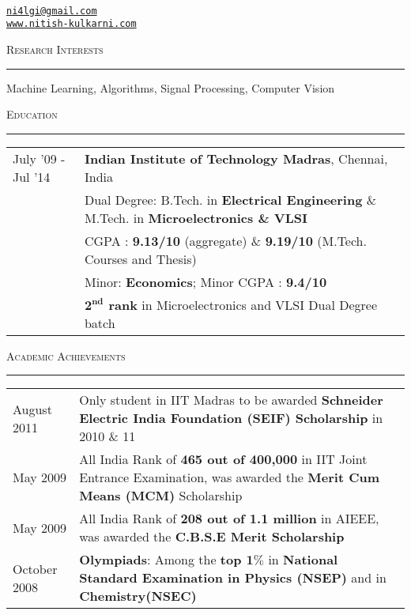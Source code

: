 \documentclass[8pt,a4paper,English]{article}
\newcommand{\lv}{\color{table-border}\vrule}
\newcommand\roottitle[1]{ \vspace{3mm} \noindent \textsc{ \large #1} \vspace{1.5mm} \nopagebreak[4] \color{gray} \hrule \color{black} \vspace{2mm} \noindent \small }
\begin{document}
 \\
\vspace{-5mm}

\begin{normalsize}
    \raggedleft \href{mailto:ni4lgi@gmail.com}{\texttt{ni4lgi\mbox{}@\mbox{}gmail.com}} \\
    \href{http://www.nitish-kulkarni.com}{\texttt{www.nitish-kulkarni.com}} \\
\end{normalsize}



\roottitle{Research Interests}
Machine Learning, Algorithms, Signal Processing, Computer Vision 

\roottitle{Education}
\renewcommand{\arraystretch}{1.2}
\setlength\tabcolsep{8pt}
\begin{tabularx}{\textwidth}{R{2.6cm} !{\lv} X}
  July '09 - Jul '14    & \textbf{Indian Institute of Technology Madras}, Chennai, India \\
                        & Dual Degree: B.Tech. in \textbf{Electrical Engineering} \& M.Tech. in \textbf{Microelectronics \& VLSI} \\
                        & CGPA : \textbf{9.13/10} (aggregate) \& \textbf{9.19/10} (M.Tech. Courses and Thesis) \\
                        & Minor: \textbf{Economics}; Minor CGPA : \textbf{9.4/10} \\
                        & \textbf{ $\bm{2^{nd}}$ rank } in Microelectronics and VLSI Dual Degree batch
\end{tabularx}


\roottitle{Academic Achievements}
\renewcommand{\arraystretch}{1.2}
\setlength\tabcolsep{8pt}
\begin{tabularx}{\textwidth}{ R{2.6cm} !{\lv} X }
  August 2011  & Only student in IIT Madras to be awarded \textbf{ Schneider Electric India Foundation (SEIF) Scholarship } in 2010 \& 11 \\
  May 2009     & All India Rank of \textbf{465 out of 400,000 } in IIT Joint Entrance Examination, was awarded the \textbf{Merit Cum Means (MCM)} Scholarship \\
  May 2009	   & All India Rank of \textbf{208 out of 1.1 million} in AIEEE, was awarded the \textbf{C.B.S.E Merit Scholarship} \\
  October 2008 & \textbf{Olympiads}: Among the \textbf{top $\bm{1\%}$} in \textbf{National Standard Examination in Physics (NSEP)} and in \textbf{Chemistry(NSEC)} \\
\end{tabularx}
\end{document}

